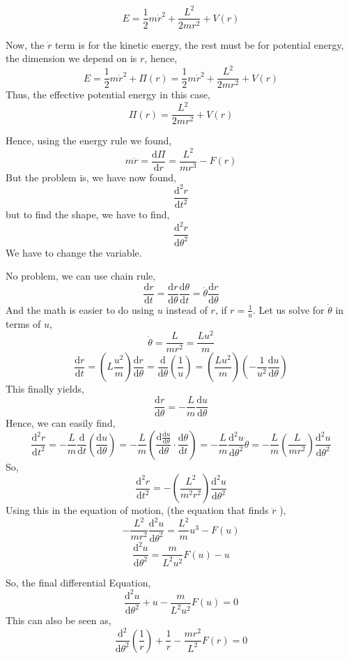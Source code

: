 \documentclass[11pt,a4paper]{article}
\begin{document}
\[ 
    E = \frac{1}{2} m \dot{r}^2 + \frac{L^2}{2mr^2} + V(r)
\]

Now, the $ \dot{r}$ term is for the kinetic energy, the rest must be for potential energy, the dimension we depend on is $r$, hence,
\[ 
    E = \frac{1}{2} m \dot{r} ^2 + \Pi(r)  = \frac{1}{2} m \dot{r}^2 + \frac{L^2}{2mr^2} + V(r)
\]
Thus, the effective potential energy in this case, 
\[ 
    \Pi(r) = \frac{L^2}{2mr^2} + V(r)
\]

Hence, using the energy rule we found,
\[ 
    m \ddot{ r } = \frac{\mathrm{d} \Pi}{\mathrm{d} r} = \frac{L^2}{mr^3} - F(r)
\]
But the problem is, we have now found, \[ 
\frac{\mathrm{d} ^2 r}{\mathrm{d} t^2}
\]but to find the shape, we have to find, 
\[ 
\frac{\mathrm{d} ^2r}{\mathrm{d} \theta^2}
\] We have to change the variable.

No problem, we can use chain rule, 
\[ 
\frac{\mathrm{d} r}{\mathrm{d} t} = \frac{\mathrm{d} r}{\mathrm{d} \theta} \frac{\mathrm{d} \theta}{\mathrm{d} t} = \dot{\theta } \frac{\mathrm{d} r}{\mathrm{d} \theta} 
\]
And the math is easier to do using $u$ instead of $r$, if $r = \frac{1}{u}$. Let us solve for $\dot{ \theta }$ in terms of $u$, 
\[ 
\dot{\theta} = \frac{L}{mr^2} = \frac{Lu^2}{m}
\]
\[ 
\frac{\mathrm{d} r}{\mathrm{d} t} =
\left( L \frac{u^2}{m} \right) \frac{\mathrm{d} r}{\mathrm{d} \theta}
=
\frac{\mathrm{d} }{\mathrm{d} \theta} \left( \frac{1}{u} \right) = \left( \frac{Lu^2}{m} \right) \left( - \frac{1}{u^2} \frac{\mathrm{d} u}{\mathrm{d} \theta} \right) 
\]
This finally yields,
\[ 
\frac{\mathrm{d} r}{\mathrm{d} \theta} = 
- \frac{L}{m} \frac{\mathrm{d} u}{\mathrm{d} \theta}
\] 
Hence, we can easily find,
\[ 
\frac{\mathrm{d} ^2 r}{\mathrm{d} t^2} = - \frac{L}{m} \frac{\mathrm{d} }{\mathrm{d} t}
\left( \frac{\mathrm{d} u}{\mathrm{d} \theta} \right) =
- \frac{L}{m} \left( \frac{\mathrm{d} 
\frac{\mathrm{d} u}{\mathrm{d} \theta}
}{\mathrm{d} \theta} \cdot  \frac{\mathrm{d} \theta}{\mathrm{d} t} \right) = - \frac{L}{m} \frac{\mathrm{d} ^2 u}{\mathrm{d} \theta^2 } \dot{\theta}
=
- \frac{L}{m} \left( \frac{L}{mr^2} \right) \frac{\mathrm{d} ^2 u}{\mathrm{d} \theta^2}
\] 
So,
\[ 
\frac{\mathrm{d} ^2 r}{\mathrm{d} t^2} =
- \left( \frac{L^2}{m^2 r^2} \right) \frac{\mathrm{d} ^2 u}{\mathrm{d} \theta ^2}
\]
Using this in the equation of motion, (the equation that finds $\ddot{ r }$ ), 
\[ 
    - \frac{L^2}{m r^2} \frac{\mathrm{d}^2 u}{\mathrm{d} \theta^2} = \frac{L^2}{m}u^3 -F(u)
\]
\[ 
    \frac{\mathrm{d} ^2 u}{\mathrm{d} \theta^2} = \frac{m}{L^2 u^2} F(u) - u
\]

So, the final differential Equation,
\[ 
\boxed{ 
    \frac{\mathrm{d} ^2 u}{\mathrm{d} \theta^2} + u - \frac{m}{L^2u^2}F(u) = 0
}
\]  
This can also be seen as,
\[
    \boxed{ \frac{\mathrm{d} ^2}{\mathrm{d} \theta^2} \left(\frac{1}{r} \right) + \frac{1}{r} - \frac{mr^2}{L^2 } F\left( r \right) =0}
\]
\end{document}
